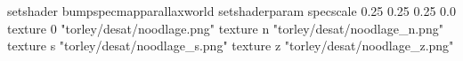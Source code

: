 setshader bumpspecmapparallaxworld
setshaderparam specscale 0.25 0.25 0.25 0.0
texture 0 "torley/desat/noodlage.png"
texture n "torley/desat/noodlage_n.png"
texture s "torley/desat/noodlage_s.png"
texture z "torley/desat/noodlage_z.png"

